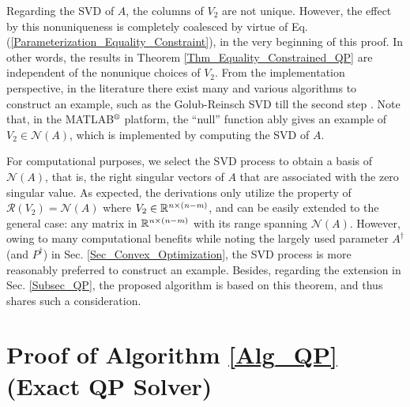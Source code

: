 \documentclass{imaman}
\newcommand{\real}{\mathbb{R}}
\newcommand{\calN}{{\mathcal N}}
\newcommand{\calR}{{\mathcal R}}
\newcommand{\itm}{{\it m}}
\newcommand{\itn}{{\it n}}
\numberwithin{equation}{section}
\begin{document}
\begin{remark}
Regarding the SVD of $A$, the columns of $V_2$ are not unique. However, the effect by this nonuniqueness is completely coalesced by virtue of Eq. (\ref{Parameterization_Equality_Constraint}), in the very beginning of this proof. In other words, the results in Theorem \ref{Thm_Equality_Constrained_QP} are independent of the nonunique choices of $V_2$. From the implementation perspective, in the literature there exist many and various algorithms to construct an example, such as the Golub-Reinsch SVD till the second step \citep{GoVa:13}. Note that, in the MATLAB$\textsuperscript{\textregistered}$ platform, the ``null'' function ably gives an example of $V_2\in\calN(A)$, which is implemented by computing the SVD of $A$.
\end{remark}

\begin{remark}
For computational purposes, we select the SVD process to obtain a basis of $\calN(A)$, that is, the right singular vectors of $A$ that are associated with the zero singular value. As expected, the derivations only utilize the property of $\calR(V_2)=\calN(A)$ where $V_2\in\real^{\itn\times(\itn-\itm)}$, and can be easily extended to the general case: any matrix in $\real^{\itn\times(\itn-\itm)}$ with its range spanning $\calN(A)$. However, owing to many computational benefits \citep{GoVa:13} while noting the largely used parameter $A^\dagger$ (and $P^\dagger$) in Sec. \ref{Sec_Convex_Optimization}, the SVD process is more reasonably preferred to construct an example. Besides, regarding the extension in Sec. \ref{Subsec_QP}, the proposed algorithm is based on this theorem, and thus shares such a consideration.
\end{remark}

\vspace{-0.6cm}\section{Proof of Algorithm \ref{Alg_QP} (Exact QP Solver)}
\label{App_Proof_QP}
\end{document}
